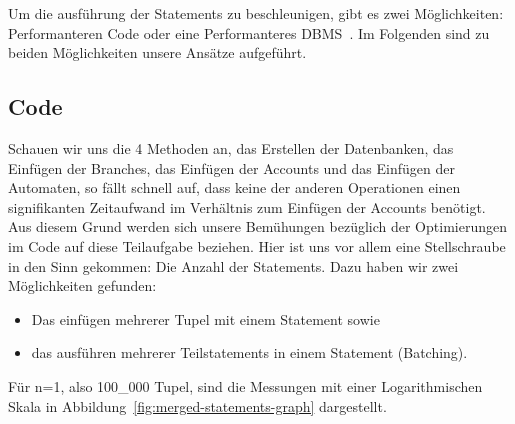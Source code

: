 Um die ausführung der Statements zu beschleunigen, gibt es zwei Möglichkeiten: Performanteren Code oder eine Performanteres DBMS~. Im Folgenden sind zu beiden Möglichkeiten unsere Ansätze aufgeführt.

\subsection{Code}\label{subsec:code}
Schauen wir uns die 4 Methoden an, das Erstellen der Datenbanken, das Einfügen der Branches, das Einfügen der Accounts und das Einfügen der Automaten, so fällt schnell auf, dass keine der anderen Operationen einen signifikanten Zeitaufwand im Verhältnis zum Einfügen der Accounts benötigt.
Aus diesem Grund werden sich unsere Bemühungen bezüglich der Optimierungen im Code auf diese Teilaufgabe beziehen.
Hier ist uns vor allem eine Stellschraube in den Sinn gekommen: Die Anzahl der Statements.
Dazu haben wir zwei Möglichkeiten gefunden:
\begin{itemize}
    \item Das einfügen mehrerer Tupel mit einem Statement sowie
    \item das ausführen mehrerer Teilstatements in einem Statement (Batching).
\end{itemize}
Für n=1, also 100\_000 Tupel, sind die Messungen mit einer Logarithmischen Skala in Abbildung~\ref{fig:merged-statements-graph} dargestellt.
